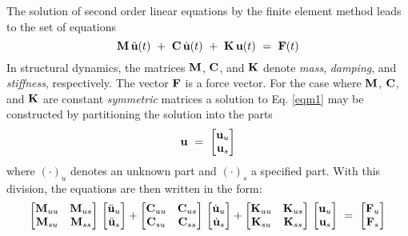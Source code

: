 The solution of second order linear equations by the finite element method
leads to the set of equations
\begin{equation}
\label{eqm1}
\mathbf{M} \, \ddot{\mathbf{u}}(t) ~+~ \mathbf{C} \,\dot{\mathbf{u}}(t) ~+~ \mathbf{K} \,\mathbf{u}(t)
~=~ \mathbf{F}(t)
\end{equation}
In structural dynamics,
the matrices $\mathbf{M}$, $\mathbf{C}$, and $\mathbf{K}$
denote {\it mass}, {\it damping}, and {\it stiffness}, respectively.  The
vector $\mathbf{F}$ is a force vector.
For the case where $\mathbf{M}$, $\mathbf{C}$, and $\mathbf{K}$ are constant {\it symmetric}
matrices a
solution to Eq. \ref{eqm1} may be constructed
by partitioning the solution into the parts
\begin{equation}
\label{eqm2}
\mathbf{u} ~=~ \left[
\begin{matrix} \mathbf{u}_u \\ \mathbf{u}_s \\ \end{matrix}
\right]
\end{equation}
where $( \cdot )_u$ denotes an unknown part and $( \cdot )_s$ a specified
part.
With this division, the equations are then written in the
form:
\begin{equation}
\label{eqm3}
\left[
\begin{matrix}
\mathbf{M}_{uu} & \mathbf{M}_{us} \\
\mathbf{M}_{su} & \mathbf{M}_{ss} \\
\end{matrix}
\right] \, \left[
\begin{matrix}
\ddot{\mathbf{u}}_u \\ \ddot{\mathbf{u}}_s \\
\end{matrix}
\right] + \left[
\begin{matrix}
\mathbf{C}_{uu} & \mathbf{C}_{us} \\
\mathbf{C}_{su} & \mathbf{C}_{ss} \\
\end{matrix}
\right] \, \left[
\begin{matrix}
\dot{\mathbf{u}}_u \\ \dot{\mathbf{u}}_s \\
\end{matrix}
\right] + \left[
\begin{matrix}
\mathbf{K}_{uu} & \mathbf{K}_{us} \\
\mathbf{K}_{su} & \mathbf{K}_{ss} \\
\end{matrix}
\right] \, \left[
\begin{matrix}
\mathbf{u}_u \\ \mathbf{u}_s \\
\end{matrix}
\right] ~=~ \left[
\begin{matrix}
\mathbf{F}_u \\ \mathbf{F}_s \\
\end{matrix}
\right]
\end{equation}

